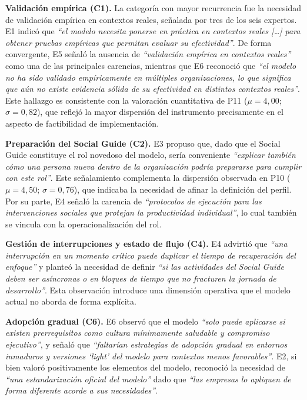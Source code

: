 \textbf{Validación empírica (C1).} La categoría con mayor recurrencia fue la necesidad de validación empírica en contextos reales, señalada por tres de los seis expertos. E1 indicó que \textit{``el modelo necesita ponerse en práctica en contextos reales [\ldots] para obtener pruebas empíricas que permitan evaluar su efectividad''}. De forma convergente, E5 señaló la ausencia de \textit{``validación empírica en contextos reales''} como una de las principales carencias, mientras que E6 reconoció que \textit{``el modelo no ha sido validado empíricamente en múltiples organizaciones, lo que significa que aún no existe evidencia sólida de su efectividad en distintos contextos reales''}. Este hallazgo es consistente con la valoración cuantitativa de P11 ($\mu = 4{,}00$; $\sigma = 0{,}82$), que reflejó la mayor dispersión del instrumento precisamente en el aspecto de factibilidad de implementación.

\textbf{Preparación del Social Guide (C2).} E3 propuso que, dado que el Social Guide constituye el rol novedoso del modelo, sería conveniente \textit{``explicar también cómo una persona nueva dentro de la organización podría prepararse para cumplir con este rol''}. Este señalamiento complementa la dispersión observada en P10 ($\mu = 4{,}50$; $\sigma = 0{,}76$), que indicaba la necesidad de afinar la definición del perfil. Por su parte, E4 señaló la carencia de \textit{``protocolos de ejecución para las intervenciones sociales que protejan la productividad individual''}, lo cual también se vincula con la operacionalización del rol.

\textbf{Gestión de interrupciones y estado de flujo (C4).} E4 advirtió que \textit{``una interrupción en un momento crítico puede duplicar el tiempo de recuperación del enfoque''} y planteó la necesidad de definir \textit{``si las actividades del Social Guide deben ser asíncronas o en bloques de tiempo que no fracturen la jornada de desarrollo''}. Esta observación introduce una dimensión operativa que el modelo actual no aborda de forma explícita.

\textbf{Adopción gradual (C6).} E6 observó que el modelo \textit{``solo puede aplicarse si existen prerrequisitos como cultura mínimamente saludable y compromiso ejecutivo''}, y señaló que \textit{``faltarían estrategias de adopción gradual en entornos inmaduros y versiones `light' del modelo para contextos menos favorables''}. E2, si bien valoró positivamente los elementos del modelo, reconoció la necesidad de \textit{``una estandarización oficial del modelo''} dado que \textit{``las empresas lo apliquen de forma diferente acorde a sus necesidades''}.

